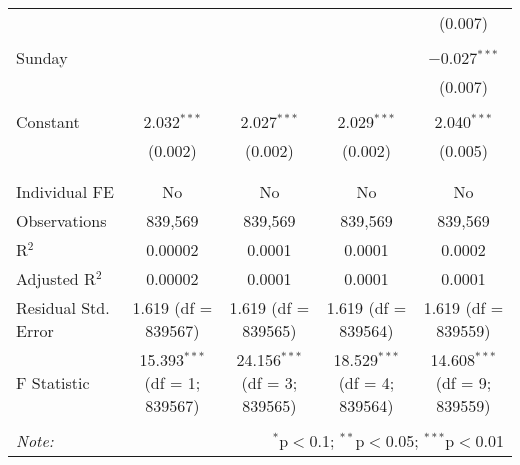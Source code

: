 \documentclass[
]{article}
\begin{document}
\begin{table}[!htbp]
{\begin{tabular}{@{\extracolsep{5pt}}lcccc}
  &  &  &  & (0.007) \\ 
  & & & & \\ 
 Sunday &  &  &  & $-$0.027$^{***}$ \\ 
  &  &  &  & (0.007) \\ 
  & & & & \\ 
 Constant & 2.032$^{***}$ & 2.027$^{***}$ & 2.029$^{***}$ & 2.040$^{***}$ \\ 
  & (0.002) & (0.002) & (0.002) & (0.005) \\ 
  & & & & \\ 
\hline \\[-1.8ex] 
Individual FE & No & No & No & No \\ 
Observations & 839,569 & 839,569 & 839,569 & 839,569 \\ 
R$^{2}$ & 0.00002 & 0.0001 & 0.0001 & 0.0002 \\ 
Adjusted R$^{2}$ & 0.00002 & 0.0001 & 0.0001 & 0.0001 \\ 
Residual Std. Error & 1.619 (df = 839567) & 1.619 (df = 839565) & 1.619 (df = 839564) & 1.619 (df = 839559) \\ 
F Statistic & 15.393$^{***}$ (df = 1; 839567) & 24.156$^{***}$ (df = 3; 839565) & 18.529$^{***}$ (df = 4; 839564) & 14.608$^{***}$ (df = 9; 839559) \\ 
\hline 
\hline \\[-1.8ex] 
\textit{Note:}  & \multicolumn{4}{r}{$^{*}$p$<$0.1; $^{**}$p$<$0.05; $^{***}$p$<$0.01} \\ 
\end{tabular}
} 
\end{table} 
\newpage
\end{document}
